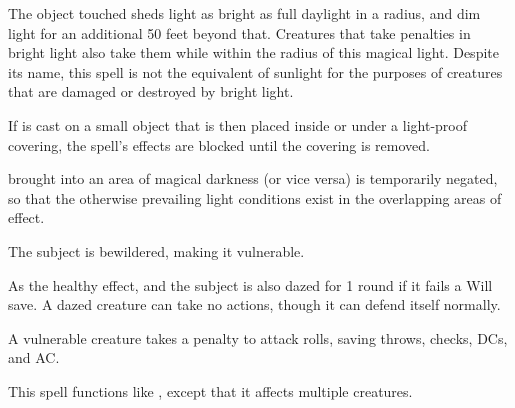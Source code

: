 \spellrng{\rngtouch}
\begin{spelleffect}
  The object touched sheds light as bright as full daylight in a \arealarge radius, and dim light for an additional 50 feet beyond that. Creatures that take penalties in bright light also take them while within the radius of this magical light. Despite its name, this spell is not the equivalent of sunlight for the purposes of creatures that are damaged or destroyed by bright light.
  \par If  is cast on a small object that is then placed inside or under a light-proof covering, the spell's effects are blocked until the covering is removed.
\end{spelleffect}
\begin{spellnotes}
   brought into an area of magical darkness (or vice versa) is temporarily negated, so that the otherwise prevailing light conditions exist in the overlapping areas of effect.
\end{spellnotes}

\spellrng{\rngmed}
\spelldur{\durshort}
\begin{spellhealthy}
  The subject is bewildered, making it vulnerable.
\end{spellhealthy}
\begin{spellblood}
  As the healthy effect, and the subject is also dazed for 1 round if it fails a Will save. A dazed creature can take no actions, though it can defend itself normally.
\end{spellblood}
\begin{spellnotes}
  A vulnerable creature takes a  penalty to attack rolls, saving throws, checks, DCs, and AC.
\end{spellnotes}

\spellrng{\rngmed}
\begin{spelleffect}
  This spell functions like , except that it affects multiple creatures.
\end{spelleffect}

